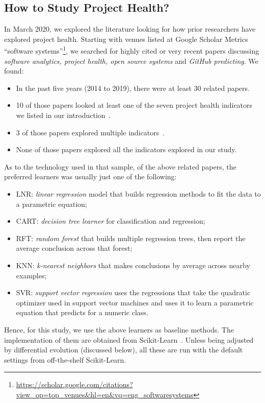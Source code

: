 \documentclass[sigconf,review,anonymous]{acmart}
\newcommand{\bi}{\begin{itemize}}
\newcommand{\ei}{\end{itemize}}
\begin{document}
\subsection{How to Study Project Health?}
\label{tion:lit}


In March 2020, we explored the literature looking for how prior researchers have explored project health. 
Starting with venues listed at Google Scholar Metrics 
``software systems''\footnote{\url{https://scholar.google.com/citations?view_op=top_venues&hl=en&vq=eng_softwaresystems}}, we searched for highly cited or very recent papers discussing 
{\em software analytics, project health, open  source systems} and {\em GitHub predicting}.
We found:
\bi
\item In the past five years (2014 to 2019), there were at least 30 related papers.
\item 10 of those papers looked at least one of the seven project health indicators we listed in our introduction~\cite{liao2019healthy,borges2016predicting,jarczyk2018surgical,kikas2016using,qi2017software,aggarwal2014co,chen2014predicting,han2019characterization,weber2014makes,bidoki2018cross}.
\item 3 of those papers explored multiple indicators~\cite{liao2019healthy,jarczyk2018surgical,bidoki2018cross}.
\item None of those papers explored all the indicators explored in our study. 
\ei
As to the technology used in that sample, of the above
related papers,   the preferred learners was usually just one of the following:
\bi
\item  LNR: {\em linear regression} model that builds regression methods to fit the data to a parametric equation; 
\item CART: {\em decision tree learner} for classification and regression;
\item RFT:  {\em random forest}   that builds multiple regression trees, then report the average conclusion across that forest;
\item KNN:  {\em k-nearest neighbors} that makes conclusions by average across nearby examples;
\item SVR:   {\em support vector regression} uses the regressions that take the quadratic optimizer used in support vector machines and uses it to learn a parametric equation that predicts for a numeric class. 
\ei
Hence, for this study, we use the above learners as baseline methods. The implementation of them are obtained from Scikit-Learn~\cite{pedregosa2011scikit}. Unless being adjusted by differential evolution (discussed below), all these are run with the default settings from off-the-shelf Scikit-Learn.
\end{document}
